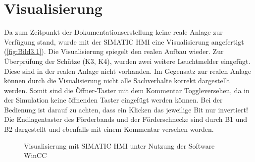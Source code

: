 \section{Visualisierung}

Da zum Zeitpunkt der Dokumentationserstellung keine reale Anlage zur Verfügung stand, wurde mit der SIMATIC HMI eine Visualisierung angefertigt (\autoref{fig:Bild3.1}). Die Visualisierung spiegelt den realen Aufbau wieder. Zur Überprüfung der Schütze (K3, K4), wurden zwei weitere Leuchtmelder eingefügt. Diese sind in der realen Anlage nicht vorhanden. Im Gegensatz zur realen Anlage können durch die Visualisierung nicht alle Sachverhalte korrekt dargestellt werden. Somit sind die Öffner-Taster mit dem Kommentar \glqq Toggle\grqq\:versehen, da in der Simulation keine öffnenden Taster eingefügt werden können. Bei der Bedienung ist darauf zu achten, dass ein Klicken das jeweilige Bit nur invertiert! Die Endlagentaster des Förderbands und der Förderschnecke sind durch B1 und B2 dargestellt und ebenfalls mit einem Kommentar versehen worden. 

\begin{figure}[H]
   \centering
   \caption[Visualisierung mit SIMATIC HMI]{Visualisierung mit SIMATIC HMI unter Nutzung der Software WinCC}
   \label{fig:Bild3.1}
\end{figure}